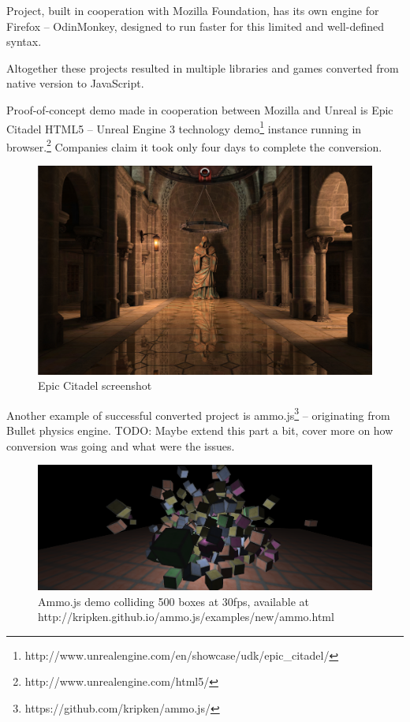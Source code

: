 

Project, built in cooperation with Mozilla Foundation, has its own engine for Firefox -- OdinMonkey, designed to run faster for this limited and well-defined syntax.

Altogether these projects resulted in multiple libraries and games converted from native version to JavaScript.

Proof-of-concept demo made in cooperation between Mozilla and Unreal is Epic Citadel HTML5 -- Unreal Engine 3 technology demo\footnote{http://www.unrealengine.com/en/showcase/udk/epic\_citadel/}  instance running in browser.\footnote{http://www.unrealengine.com/html5/} Companies claim it took only four days to complete the conversion.

\begin{figure}[h!]
  \caption{Epic Citadel screenshot}
  \label{img:epicitadel}
  \centering
	\includegraphics[width=16cm]{emscripten/epic-citadel.jpg}
\end{figure}

Another example of successful converted project is ammo.js\footnote{https://github.com/kripken/ammo.js/} -- originating from Bullet physics engine.
TODO: Maybe extend this part a bit, cover more on how conversion was going and what were the issues.

\begin{figure}[h!]
  \caption{Ammo.js demo colliding 500 boxes at 30fps, available at http://kripken.github.io/ammo.js/examples/new/ammo.html}
  \label{img:epicitadel}
  \centering
	\includegraphics[width=16cm]{emscripten/ammojs.png}
\end{figure}

